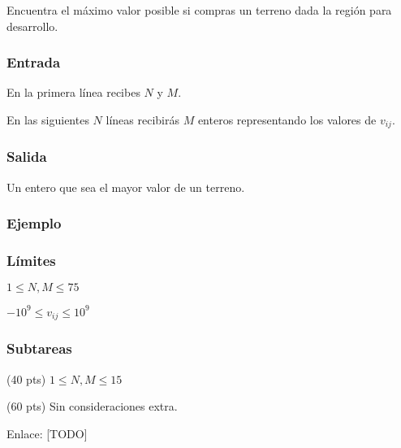 Encuentra el máximo valor posible si compras un terreno dada la región para desarrollo.

\subsubsection*{Entrada}

En la primera línea recibes \(N\) y \(M\).

En las siguientes \(N\) líneas recibirás \(M\) enteros representando los valores de \(v_{ij}\).

\subsubsection*{Salida}

Un entero que sea el mayor valor de un terreno.

\subsubsection*{Ejemplo}

\begin{casebox2}
	\hline
\end{casebox2}

\subsubsection*{Límites}

\begin{plimits}
	\item \(1\leq N, M\leq 75 \)
	\item \(-10^9\leq v_{ij}\leq 10^9 \)
\end{plimits}

\subsubsection*{Subtareas}

\begin{plimits}
	\item (40 pts) \(1\leq N, M\leq 15 \)
	\item (60 pts) Sin consideraciones extra.
\end{plimits}

Enlace: [TODO]

